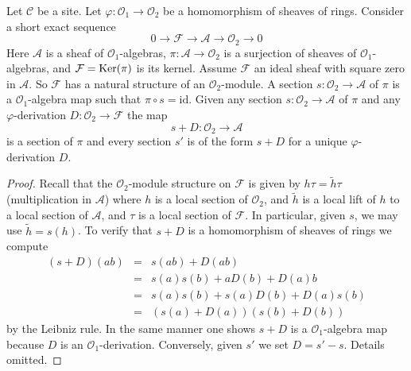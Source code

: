 \begin{lemma}
\label{lemma-double-structure-gives-derivation}
Let $\mathcal{C}$ be a site. Let $\varphi : \mathcal{O}_1 \to \mathcal{O}_2$
be a homomorphism of sheaves of rings.
Consider a short exact sequence
$$
0 \to \mathcal{F} \to \mathcal{A} \to \mathcal{O}_2 \to 0
$$
Here $\mathcal{A}$ is a sheaf of $\mathcal{O}_1$-algebras,
$\pi : \mathcal{A} \to \mathcal{O}_2$ is a surjection
of sheaves of $\mathcal{O}_1$-algebras, and
$\mathcal{F} = \mathop{\mathrm{Ker}}(\pi)$ is its kernel. Assume $\mathcal{F}$ an ideal
sheaf with square zero in $\mathcal{A}$. So $\mathcal{F}$
has a natural structure of an $\mathcal{O}_2$-module.
A section $s : \mathcal{O}_2 \to \mathcal{A}$ of $\pi$
is a $\mathcal{O}_1$-algebra map such that $\pi \circ s = \text{id}$.
Given any section $s : \mathcal{O}_2 \to \mathcal{A}$
of $\pi$ and any $\varphi$-derivation $D : \mathcal{O}_2 \to \mathcal{F}$
the map
$$
s + D : \mathcal{O}_2 \to \mathcal{A}
$$
is a section of $\pi$ and every section $s'$ is of the form $s + D$
for a unique $\varphi$-derivation $D$.
\end{lemma}

\begin{proof}
Recall that the $\mathcal{O}_2$-module structure on $\mathcal{F}$
is given by $h \tau = \tilde h \tau$ (multiplication in $\mathcal{A}$)
where $h$ is a local section of $\mathcal{O}_2$, and
$\tilde h$ is a local lift of $h$ to a local
section of $\mathcal{A}$, and $\tau$ is a local section of $\mathcal{F}$.
In particular, given $s$, we may use $\tilde h = s(h)$.
To verify that $s + D$ is a homomorphism of sheaves of rings we
compute
\begin{eqnarray*}
(s + D)(ab) & = & s(ab) + D(ab) \\
& = & s(a)s(b) + aD(b) + D(a)b \\
& = & s(a) s(b) + s(a)D(b) + D(a)s(b) \\
& = & (s(a) + D(a))(s(b) + D(b))
\end{eqnarray*}
by the Leibniz rule. In the same manner one shows
$s + D$ is a $\mathcal{O}_1$-algebra map because $D$ is
an $\mathcal{O}_1$-derivation. Conversely, given $s'$ we set
$D = s' - s$. Details omitted.
\end{proof}

